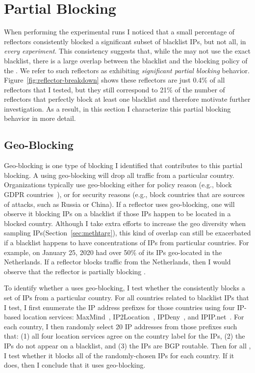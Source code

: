 \section{Partial Blocking}
\label{sec:partial-blocking}

When performing the experimental runs I noticed that a small
percentage of reflectors consistently blocked a significant subset of
blacklist IPs, but not all, in \textit{every experiment}.
This consistency suggests that, while the
{} may not use the exact blacklist, there is a large overlap
between the blacklist and the blocking policy of the {}.  We
refer to such reflectors as exhibiting \textit{significant partial blocking}
behavior.  Figure~\ref{fig:reflector-breakdown} shows these reflectors
are just 0.4\% of all reflectors that I tested, but they still
correspond to 21\% of the number of reflectors that perfectly block at
least one blacklist and therefore motivate further investigation.  As
a result, in this section I characterize this partial blocking
behavior in more detail.

\subsection{Geo-Blocking}
\label{sec:geo-blocking}

Geo-blocking is one type of blocking I identified that contributes to
this partial blocking.  A {} using geo-blocking will
drop all traffic from a particular country.  Organizations typically
use geo-blocking either for policy reason (e.g., block GDPR
countries~\cite{bbcnews}), or for security reasons (e.g., block
countries that are sources of attacks, such as Russia or China).  If a
reflector uses geo-blocking, one will observe it blocking IPs on a
blacklist if those IPs happen to be located in a blocked country.  Although
I take extra efforts to increase the geo diversity when sampling IPs(Section~\ref{sec:methtarg}),
this kind of overlap can still be exacerbated if a blacklist happens to have
concentrations of IPs from particular countries.  For example,
{\dshieldtop} on January 25, 2020 had over 50\% of its IPs geo-located
in the Netherlands.  If a reflector blocks traffic from the
Netherlands, then I would observe that the reflector is partially
blocking {\dshieldtop}.

To identify whether a {} uses geo-blocking, I test whether
the {} consistently blocks a set of IPs from a particular
country.  For all countries related to blacklist IPs that I test, I
first enumerate the IP address prefixes for those countries using four
IP-based location services: MaxMind~\cite{maxmind},
IP2Location~\cite{ip2location}, IPDeny~\cite{ipdeny}, and
IPIP.net~\cite{ipip}.  For each country, I then randomly select 20 IP
addresses from those prefixes such that: (1) all four location
services agree on the country label for the IPs, (2) the IPs do not
appear on a blacklist, and (3) the IPs are BGP routable.  Then for all
{}, I test whether it blocks all of the randomly-chosen
IPs for each country.  If it does, then I conclude that it uses
geo-blocking.

